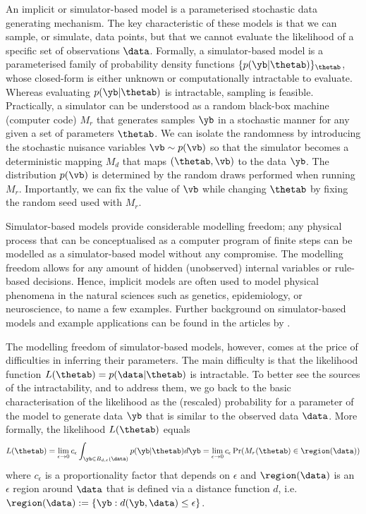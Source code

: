 An implicit or simulator-based model is a parameterised stochastic
data generating mechanism. The key characteristic of these models is
that we can sample, or simulate, data points, but that we cannot
evaluate the likelihood of a specific set of observations
$\data$. Formally, a simulator-based model is a parameterised family
of probability density functions $\{ p(\yb|\thetab) \}_{\thetab}$,
whose closed-form is either unknown or computationally intractable to
evaluate. Whereas evaluating $p(\yb|\thetab)$ is intractable, sampling
is feasible. Practically, a simulator can be understood as a random black-box
machine (computer code) $M_r$ that generates samples $\yb$ in a stochastic manner for
any given a set of parameters $\thetab$. We can isolate the randomness by introducing the stochastic nuisance variables $\vb \sim p(\vb)$ so that the simulator becomes a deterministic mapping $M_d$ that maps $(\thetab, \vb)$ to the data $\yb$. The distribution $p(\vb)$ is determined by the random draws performed when running $M_r$. Importantly, we can fix the value of $\vb$ while changing $\thetab$ by fixing the random seed used with $M_r$.

Simulator-based models provide considerable modelling freedom; any
physical process that can be conceptualised as a computer program of
finite steps can be modelled as a simulator-based model without any
compromise. The modelling freedom allows for any amount of hidden
(unobserved) internal variables or rule-based decisions. Hence,
implicit models are often used to model physical phenomena in the
natural sciences such as genetics, epidemiology, or neuroscience, to
name a few examples. Further background on simulator-based models and
example applications can be found in the articles
by \citet{Gutmann2016, Lintusaari2017, Sisson2018, Cranmer2020}.


The modelling freedom of simulator-based models, however, comes at the
price of difficulties in inferring their parameters. The main
difficulty is that the likelihood function $L(\thetab) =
p(\data|\thetab)$ is intractable. To better see the sources of the
intractability, and to address them, we go back to the basic
characterisation of the likelihood as the (rescaled) probability for a
parameter of the model to generate data $\yb$ that is similar to the
observed data $\data$. More formally, the likelihood $L(\thetab)$
equals
\begin{equation} \label{eq:likelihood}
  L(\thetab) = \lim_{\epsilon \to 0} c_\epsilon \int_{\yb \in B_{d,\epsilon}(\data)} p(\yb|\thetab)d\yb =
  \lim_{\epsilon \to 0} c_\epsilon \Pr(M_r(\thetab) \in \region(\data))
\end{equation}
where $c_\epsilon$ is a proportionality factor that depends on
$\epsilon$ and $\region(\data)$ is an $\epsilon$ region around $\data$
that is defined via a distance function $d$, i.e.\ $\region(\data)
:= \{\yb: d(\yb, \data) \leq \epsilon \}$. 


